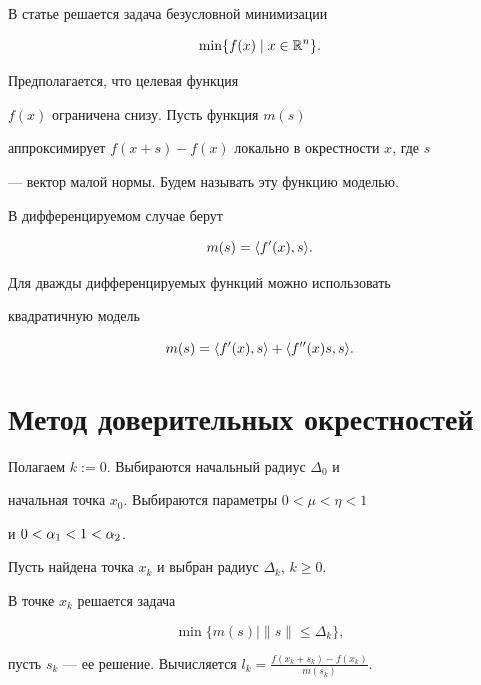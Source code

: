 В статье решается задача безусловной минимизации


$$


\min\{f(x)\mid x \in \R^n\}.


$$


Предполагается, что целевая функция


$f(x)$ ограничена снизу. Пусть функция $m(s)$


аппроксимирует $f(x+s) - f(x)$ локально в окрестности $x$, где $s$


--- вектор малой нормы. Будем называть эту функцию моделью.





В дифференцируемом случае берут


$$


m(s) = \la f^{\prime} (x), s\ra.


$$


Для дважды дифференцируемых функций можно использовать


квадратичную модель \cite{more}


$$


m(s) = \la f^{\prime} (x), s\ra  + \la f^{\prime \prime} (x) s, s\ra.


$$








\section{Метод доверительных окрестностей}





Полагаем $k:=0$. Выбираются начальный радиус $\Delta_0$ и


начальная точка $x_0$. Выбираются параметры $0 < \mu < \eta < 1$


и $0 < \alpha_1 < 1 < \alpha_2$.


Пусть найдена точка $x_k$ и выбран радиус $\Delta_k$, $k\ge0$.





В точке $x_k$ решается задача


$$


\min \{m(s)\mid \|s\| \leq \Delta_k\},


$$


пусть $s_k$ --- ее решение. Вычисляется $l_k=\frac{f(x_k+s_k)-f(x_k)}{m(s_k)}$.





